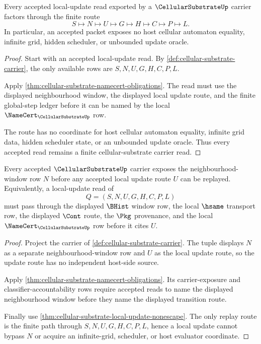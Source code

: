 \begin{theorem}
\label{thm:cellular-substrate-local-update-nonescape}
Every accepted local-update read exported by a $\CellularSubstrateUp$ carrier factors through the finite route
$$
S \longmapsto N \longmapsto U \longmapsto G \longmapsto H \longmapsto C \longmapsto P \longmapsto L.
$$
In particular, an accepted packet exposes no host cellular automaton equality, infinite grid, hidden scheduler, or unbounded update oracle.
\end{theorem}
\begin{proof}
Start with an accepted local-update read. By \autoref{def:cellular-substrate-carrier}, the only available rows are $S,N,U,G,H,C,P,L$.

Apply \autoref{thm:cellular-substrate-namecert-obligations}. The read must use the displayed neighbourhood window, the displayed local update route, and the finite global-step ledger before it can be named by the local $\NameCert_{\CellularSubstrateUp}$ row.

The route has no coordinate for host cellular automaton equality, infinite grid data, hidden scheduler state, or an unbounded update oracle. Thus every accepted read remains a finite cellular-substrate carrier read.
\end{proof}

\begin{theorem}
\label{thm:cellular-substrate-window-exposure-obligation}
Every accepted $\CellularSubstrateUp$ carrier exposes the neighbourhood-window row $N$ before any accepted local update route $U$ can be replayed. Equivalently, a local-update read of
$$
Q=(S,N,U,G,H,C,P,L)
$$
must pass through the displayed $\BHist$ window row, the local $\hsame$ transport row, the displayed $\Cont$ route, the $\Pkg$ provenance, and the local $\NameCert_{\CellularSubstrateUp}$ row before it cites $U$.
\end{theorem}
\begin{proof}
Project the carrier of \autoref{def:cellular-substrate-carrier}. The tuple displays $N$ as a separate neighbourhood-window row and $U$ as the local update route, so the update route has no independent host-side source.

Apply \autoref{thm:cellular-substrate-namecert-obligations}. Its carrier-exposure and classifier-accountability rows require accepted reads to name the displayed neighbourhood window before they name the displayed transition route.

Finally use \autoref{thm:cellular-substrate-local-update-nonescape}. The only replay route is the finite path through $S,N,U,G,H,C,P,L$, hence a local update cannot bypass $N$ or acquire an infinite-grid, scheduler, or host evaluator coordinate.
\end{proof}


